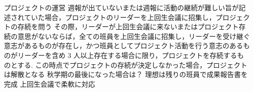 プロジェクトの運営
    週報が出ていないまたは週報に活動の継続が難しい旨が記述されていた場合，プロジェクトのリーダーを上回生会議に招集し，プロジェクトの存続を問う
    その際，リーダーが上回生会議に来ないまたはプロジェクト存続の意思がないならば，全ての班員を上回生会議に招集し，リーダーを受け継ぐ意志があるものが存在し，かつ班員としてプロジェクト活動を行う意志のあるものがリーダーを含め 3 人以上存在する場合に限り，プロジェクトを存続するものとする.
    この時点でプロジェクトの存続が決定しなかった場合，プロジェクトは解散となる
    秋学期の最後になった場合は？
        理想は残りの班員で成果報告書を完成
        上回生会議で柔軟に対応
        
    
